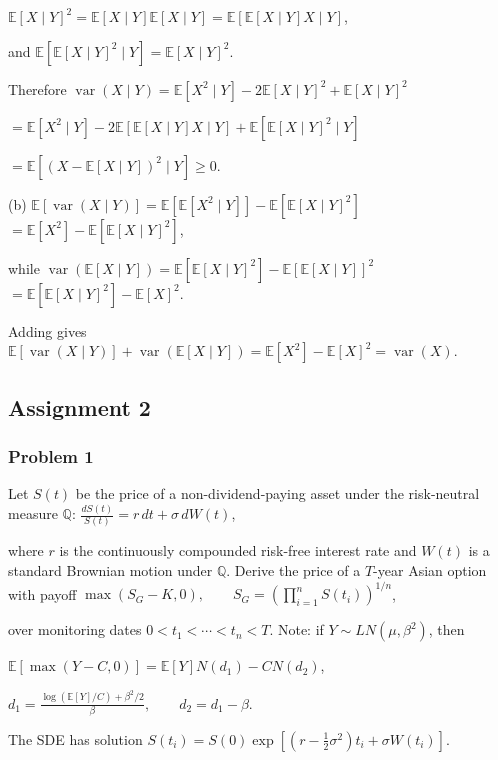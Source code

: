$\mathbb{E}[X\mid Y]^2=\mathbb{E}[X\mid Y]\mathbb{E}[X\mid Y]=\mathbb{E}[\mathbb{E}[X\mid Y]X\mid Y]$,

and
$\mathbb{E}[\mathbb{E}[X\mid Y]^2\mid Y]=\mathbb{E}[X\mid Y]^2$.

Therefore
$\operatorname{var}(X\mid Y)=\mathbb{E}[X^2\mid Y]-2\mathbb{E}[X\mid Y]^2+\mathbb{E}[X\mid Y]^2$

$=\mathbb{E}[X^2\mid Y]-2\mathbb{E}[\mathbb{E}[X\mid Y]X\mid Y]+\mathbb{E}[\mathbb{E}[X\mid Y]^2\mid Y]$

$=\mathbb{E}[(X-\mathbb{E}[X\mid Y])^2\mid Y]\geq0$.

(b)
$\mathbb{E}[\operatorname{var}(X\mid Y)]=\mathbb{E}[\mathbb{E}[X^2\mid Y]]-\mathbb{E}[\mathbb{E}[X\mid Y]^2]$
$=\mathbb{E}[X^2]-\mathbb{E}[\mathbb{E}[X\mid Y]^2]$,

while
$\operatorname{var}(\mathbb{E}[X\mid Y])=\mathbb{E}[\mathbb{E}[X\mid Y]^2]-\mathbb{E}[\mathbb{E}[X\mid Y]]^2$
$=\mathbb{E}[\mathbb{E}[X\mid Y]^2]-\mathbb{E}[X]^2$.

Adding gives
$\mathbb{E}[\operatorname{var}(X\mid Y)]+\operatorname{var}(\mathbb{E}[X\mid Y])=\mathbb{E}[X^2]-\mathbb{E}[X]^2=\operatorname{var}(X)$.

\subsection{Assignment 2}

\subsubsection*{Problem 1}

 Let $S(t)$ be the price of a non-dividend-paying asset under the risk-neutral measure $\mathbb Q$:
$\frac{dS(t)}{S(t)}=r\,dt+\sigma\,dW(t)$,

where $r$ is the continuously compounded risk-free interest rate and $W(t)$ is a standard Brownian motion under $\mathbb Q$. Derive the price of a $T$-year Asian option with payoff
$\max(S_G-K,0),\qquad S_G=\left(\prod_{i=1}^nS(t_i)\right)^{1/n}$,

over monitoring dates $0<t_1<\cdots<t_n<T$. Note: if $Y\sim LN(\mu,\beta^2)$, then

$\mathbb{E}[\max(Y-C,0)]=\mathbb{E}[Y]N(d_1)-CN(d_2)$,

$d_1=\frac{\log(\mathbb{E}[Y]/C)+\beta^2/2}{\beta},\qquad d_2=d_1-\beta$.

 The SDE has solution
$S(t_i)=S(0)\exp\left[\left(r-\frac12\sigma^2\right)t_i+\sigma W(t_i)\right]$.

